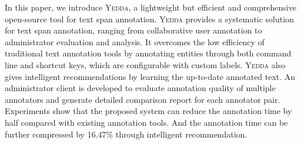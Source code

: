 In this paper, we introduce \textsc{Yedda}, a lightweight but efficient and comprehensive open-source tool for text span annotation. \textsc{Yedda} provides a systematic solution for text span annotation, ranging from collaborative user annotation to administrator evaluation and analysis. It overcomes the low efficiency of traditional text annotation tools by annotating entities through both command line and shortcut keys, which are configurable with custom labels. \textsc{Yedda} also gives intelligent recommendations by learning the up-to-date annotated text. An administrator client is developed to evaluate annotation quality of multiple annotators and generate detailed comparison report for each annotator pair. Experiments show that the proposed system can reduce the annotation time by half compared with existing annotation tools. And the annotation time can be further compressed by 16.47\% through intelligent recommendation.
